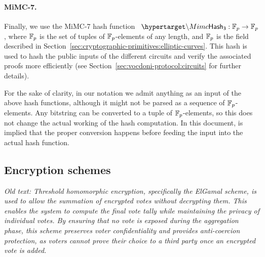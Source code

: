 
\paragraph{MiMC-7.} Finally, we use the MiMC-7 hash function~\cite{albrecht16mimc} $\hlset{\Mimc} : \F_p \rightarrow \F_p$, where $\mathbb{F}_p$ is the set of tuples of $\mathbb{F}_p$-elements of any length, and $\mathbb{F}_p$ is the field described in Section~\ref{sec:cryptographic-primitives:elliptic-curves}. This hash is used to hash the public inputs of the different circuits and verify the associated proofs more efficiently (see Section~\ref{sec:vocdoni-protocol:circuits} for further details).

For the sake of clarity, in our notation we admit anything as an input of the above hash functions, although it might not be parsed as a sequence of $\mathbb{F}_p$-elements. Any bitstring can be converted to a tuple of $\mathbb{F}_p$-elements, so this does not change the actual working of the hash computation. In this document, is implied that the proper conversion happens before feeding the input into the actual hash function.



\subsection{Encryption schemes}
\label{sec:cryptographic-primitives:encryption}

\textit{Old text: Threshold homomorphic encryption, specifically the ElGamal scheme, is used to allow the summation of encrypted votes without decrypting them. This enables the system to compute the final vote tally while maintaining the privacy of individual votes. By ensuring that no vote is exposed during the aggregation phase, this scheme preserves voter confidentiality and provides anti-coercion protection, as voters cannot prove their choice to a third party once an encrypted vote is added.}\\

